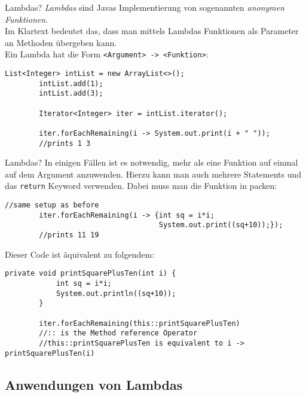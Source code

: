 \begin{frame}[fragile]{Lambdas?}
    \textit{Lambdas} sind Javas Implementierung von sogenannten \textit{anonymen Funktionen}. \\
    Im Klartext bedeutet das, dass man mittels Lambdas Funktionen als Parameter an Methoden übergeben kann. \\
    \pause
    Ein Lambda hat die Form \texttt{<Argument> -> <Funktion>}:
    \begin{lstlisting}[gobble=8]
        List<Integer> intList = new ArrayList<>();
        intList.add(1);
        intList.add(3);

        Iterator<Integer> iter = intList.iterator();

        iter.forEachRemaining(i -> System.out.print(i + " ")); 
        //prints 1 3
    \end{lstlisting}
\end{frame}

\begin{frame}[fragile]{Lambdas?}
    In einigen Fällen ist es notwendig, mehr als eine Funktion auf einmal auf dem Argument anzuwenden. Hierzu kann man auch mehrere Statements und das \texttt{return} Keyword verwenden. Dabei muss man die Funktion in {} packen:
    \begin{lstlisting}[gobble=8]
        //same setup as before
        iter.forEachRemaining(i -> {int sq = i*i;
                                    System.out.print((sq+10));}); 
        //prints 11 19
    \end{lstlisting}
    Dieser Code ist äquivalent zu folgendem:
    \begin{lstlisting}[gobble=8,basicstyle=\ttfamily\scriptsize]
        private void printSquarePlusTen(int i) {
            int sq = i*i;
            System.out.println((sq+10));
        }

        iter.forEachRemaining(this::printSquarePlusTen) 
        //:: is the Method reference Operator
        //this::printSquarePlusTen is equivalent to i -> printSquarePlusTen(i)
    \end{lstlisting}
\end{frame}

\subsection{Anwendungen von Lambdas}

